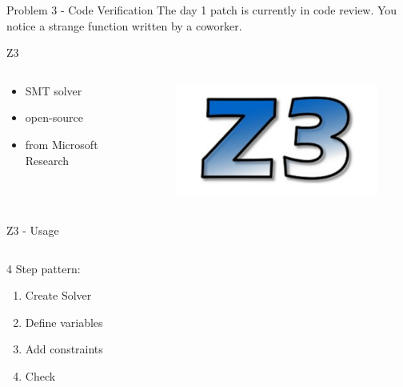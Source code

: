 \documentclass{beamer}
\begin{document}
\begin{frame}{Problem 3 - Code Verification}
The day 1 patch is currently in code review. You notice a strange function written by a coworker.

\end{frame}


\begin{frame}{Z3}
\begin{columns}
\begin{column}{0.5\textwidth}
	\begin{itemize}
		\item SMT solver
		\item open-source
		\item from Microsoft Research
	\end{itemize}
\end{column}
\begin{column}{0.5\textwidth}
	\begin{figure}
		\includegraphics[scale=0.3]{../Images/z3logo.png}
	\end{figure}
\end{column}

\end{columns}

\end{frame}

\begin{frame}{Z3 - Usage}
	
	
\begin{columns}
	\begin{column}{0.4\textwidth}
		4 Step pattern:
		\begin{enumerate}
			\item Create Solver
			\item Define variables
			\item Add constraints
			\item Check
		\end{enumerate}
	\end{column}
	\begin{column}{0.6\textwidth}
		\pause
		
		
	\end{column}
	
\end{columns}
\end{frame}
\end{document}
